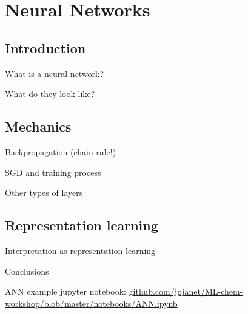 
\section{Neural Networks}
\subsection{Introduction}
\begin{frame}[t]{What is a neural network?}

\end{frame}
\begin{frame}[t]{What do they look like?}

\end{frame}
\subsection{Mechanics}
\begin{frame}[t]{Backpropagation (chain rule!)}

\end{frame}
\begin{frame}[t]{SGD and training process}

\end{frame}
\begin{frame}[t]{Other types of layers}

\end{frame}
\subsection{Representation learning}
\begin{frame}[t]{Interpretation as representation learning}

\end{frame}
\begin{frame}[t]{Conclusions}

\end{frame}

\begin{frame}{ANN example}
jupyter notebook: \url{github.com/jpjanet/ML-chem-workshop/blob/master/notebooks/ANN.ipynb}
\end{frame}